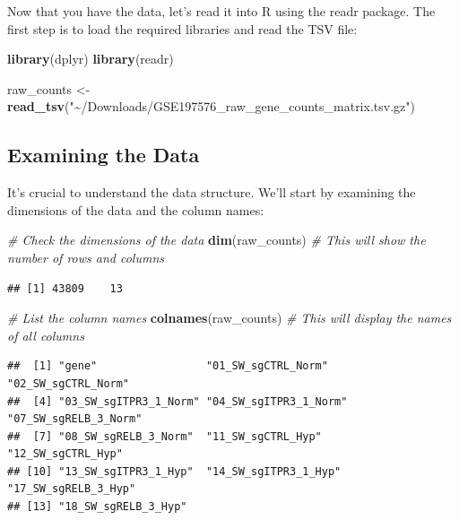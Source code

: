\documentclass[
]{book}
\newenvironment{Shaded}{\begin{snugshade}}{\end{snugshade}}
\newcommand{\CommentTok}[1]{\textcolor[rgb]{0.56,0.35,0.01}{\textit{#1}}}
\newcommand{\FunctionTok}[1]{\textcolor[rgb]{0.13,0.29,0.53}{\textbf{#1}}}
\newcommand{\NormalTok}[1]{#1}
\newcommand{\OtherTok}[1]{\textcolor[rgb]{0.56,0.35,0.01}{#1}}
\newcommand{\StringTok}[1]{\textcolor[rgb]{0.31,0.60,0.02}{#1}}
\begin{document}
Now that you have the data, let's read it into R using the readr package. The first step is to load the required libraries and read the TSV file:

\begin{Shaded}
\begin{Highlighting}[]
\FunctionTok{library}\NormalTok{(dplyr)}
\FunctionTok{library}\NormalTok{(readr)}

\NormalTok{raw\_counts }\OtherTok{\textless{}{-}} \FunctionTok{read\_tsv}\NormalTok{(}\StringTok{"\textasciitilde{}/Downloads/GSE197576\_raw\_gene\_counts\_matrix.tsv.gz"}\NormalTok{)}
\end{Highlighting}
\end{Shaded}

\hypertarget{examining-the-data}{%
\subsection{Examining the Data}\label{examining-the-data}}

It's crucial to understand the data structure. We'll start by examining the dimensions of the data and the column names:

\begin{Shaded}
\begin{Highlighting}[]
\CommentTok{\# Check the dimensions of the data}
\FunctionTok{dim}\NormalTok{(raw\_counts)  }\CommentTok{\# This will show the number of rows and columns}
\end{Highlighting}
\end{Shaded}

\begin{verbatim}
## [1] 43809    13
\end{verbatim}

\begin{Shaded}
\begin{Highlighting}[]
\CommentTok{\# List the column names}
\FunctionTok{colnames}\NormalTok{(raw\_counts)  }\CommentTok{\# This will display the names of all columns}
\end{Highlighting}
\end{Shaded}

\begin{verbatim}
##  [1] "gene"                 "01_SW_sgCTRL_Norm"    "02_SW_sgCTRL_Norm"   
##  [4] "03_SW_sgITPR3_1_Norm" "04_SW_sgITPR3_1_Norm" "07_SW_sgRELB_3_Norm" 
##  [7] "08_SW_sgRELB_3_Norm"  "11_SW_sgCTRL_Hyp"     "12_SW_sgCTRL_Hyp"    
## [10] "13_SW_sgITPR3_1_Hyp"  "14_SW_sgITPR3_1_Hyp"  "17_SW_sgRELB_3_Hyp"  
## [13] "18_SW_sgRELB_3_Hyp"
\end{verbatim}
\end{document}
